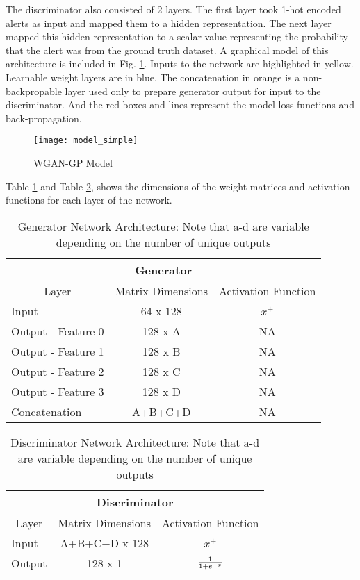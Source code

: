 The discriminator also consisted of 2 layers. The first layer took 1-hot encoded alerts as input and mapped them to a hidden representation. The next layer mapped this hidden representation to a scalar value representing the probability that the alert was from the ground truth dataset. A graphical model of this architecture is included in Fig. \ref{fig:model_simple}. Inputs to the network are highlighted in yellow. Learnable weight layers are in blue. The concatenation in orange is a non-backpropable layer used only to prepare generator output for input to the discriminator. And the red boxes and lines represent the model loss functions and back-propagation.

\begin{figure}[!htbp]
	\centering%
	\texttt{[image: model\_simple]}
	\caption{WGAN-GP Model}
	\label{fig:model_simple}
\end{figure}

Table \ref{tab:model_simple_a} and Table \ref{tab:model_simple_b}, shows the dimensions of the weight matrices and activation functions for each layer of the network.

\begin{table}[!htbp]
	\centering
	\caption{Generator Network Architecture: Note that a-d are variable depending on the number of unique outputs}
	\label{tab:model_simple_a}
	\begin{tabular}{l|c|c}
		\hline
		\multicolumn{3}{c}{\textbf{Generator}} \\ 
		\hline
		\multicolumn{1}{c|}{Layer} & \multicolumn{1}{c|}{Matrix Dimensions} & \multicolumn{1}{c}{Activation Function} \\ \hline
		Input & 64 x 128 & {$x^+$} \\
		Output - Feature 0 & 128 x A & NA \\
		Output - Feature 1 & 128 x B & NA \\
		Output - Feature 2 & 128 x C & NA \\
		Output  - Feature 3 & 128 x D & NA \\
		Concatenation & A+B+C+D & NA \\
		\hline
	\end{tabular}
\end{table}

\begin{table}[!htbp]
	\centering
	\caption{Discriminator Network Architecture: Note that a-d are variable depending on the number of unique outputs}
	\label{tab:model_simple_b}
	\begin{tabular}{l|c|c}
		\hline
		\multicolumn{3}{c}{\textbf{Discriminator}} \\ 
		\hline
		\multicolumn{1}{c|}{Layer} & \multicolumn{1}{c|}{Matrix Dimensions} & \multicolumn{1}{c}{Activation Function} \\ \hline
		Input & A+B+C+D x 128 & {$x^+$} \\
		Output & 128 x 1 & {$1 \over {1+e^{-x}}$} \\
		\hline
	\end{tabular}
\end{table}


